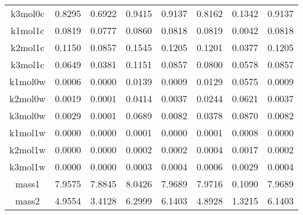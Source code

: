 \begin{table}
\begin{tabular}{cccccccc}
k3mol0c & 0.8295 & 0.6922 & 0.9415 & 0.9137 & 0.8162 & 0.1342 & 0.9137 \\
k1mol1c & 0.0819 & 0.0777 & 0.0860 & 0.0818 & 0.0819 & 0.0042 & 0.0818 \\
k2mol1c & 0.1150 & 0.0857 & 0.1545 & 0.1205 & 0.1201 & 0.0377 & 0.1205 \\
k3mol1c & 0.0649 & 0.0381 & 0.1151 & 0.0857 & 0.0800 & 0.0578 & 0.0857 \\
k1mol0w & 0.0006 & 0.0000 & 0.0139 & 0.0009 & 0.0129 & 0.0575 & 0.0009 \\
k2mol0w & 0.0019 & 0.0001 & 0.0414 & 0.0037 & 0.0244 & 0.0621 & 0.0037 \\
k3mol0w & 0.0029 & 0.0001 & 0.0689 & 0.0082 & 0.0378 & 0.0870 & 0.0082 \\
k1mol1w & 0.0000 & 0.0000 & 0.0001 & 0.0000 & 0.0001 & 0.0008 & 0.0000 \\
k2mol1w & 0.0000 & 0.0000 & 0.0002 & 0.0002 & 0.0004 & 0.0017 & 0.0002 \\
k3mol1w & 0.0000 & 0.0000 & 0.0003 & 0.0004 & 0.0006 & 0.0029 & 0.0004 \\
mass1 & 7.9575 & 7.8845 & 8.0426 & 7.9689 & 7.9716 & 0.1090 & 7.9689 \\
mass2 & 4.9554 & 3.4128 & 6.2999 & 6.1403 & 4.8928 & 1.3215 & 6.1403 \\
\end{tabular}
\end{table}
